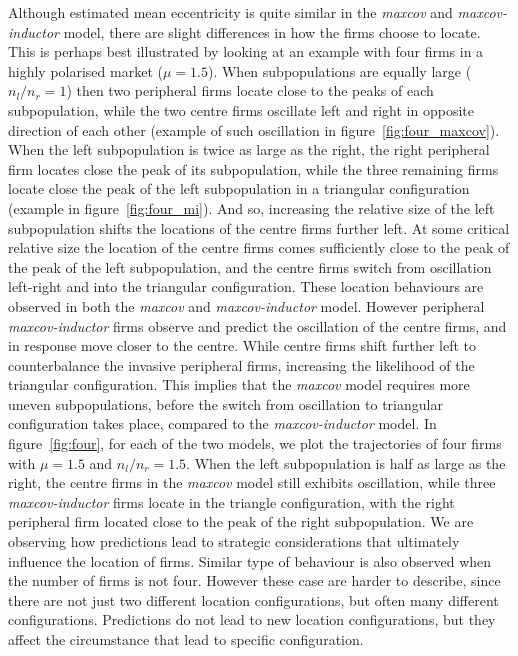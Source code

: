 \documentclass[preprint, 12pt]{elsarticle}
\begin{document}
Although estimated mean eccentricity is quite similar in the \emph{maxcov} and \emph{maxcov-inductor} model, there are slight differences in how the firms choose to locate. This is perhaps best illustrated by looking at an example with four firms in a highly polarised market ($\mu=1.5$). When subpopulations are equally large ($n_l/n_r = 1$) then two peripheral firms locate close to the peaks of each subpopulation, while the two centre firms oscillate left and right in opposite direction of each other (example of such oscillation in figure~\ref{fig:four_maxcov}). When the left subpopulation is twice as large as the right, the right peripheral firm locates close the peak of its subpopulation, while the three remaining firms locate close the peak of the left subpopulation in a triangular configuration (example in figure~\ref{fig:four_mi}). And so, increasing the relative size of the left subpopulation shifts the locations of the centre firms further left. At some critical relative size the location of the centre firms comes sufficiently close to the peak of the peak of the left subpopulation, and the centre firms switch from oscillation left-right and into the triangular configuration. These location behaviours are observed in both the \emph{maxcov} and \emph{maxcov-inductor} model. However peripheral \emph{maxcov-inductor} firms observe and predict the oscillation of the centre firms, and in response move closer to the centre. While centre firms shift further left to counterbalance the invasive peripheral firms, increasing the likelihood of the triangular configuration. This implies that the \emph{maxcov} model requires more uneven subpopulations, before the switch from oscillation to triangular configuration takes place, compared to the \emph{maxcov-inductor} model. In figure~\ref{fig:four}, for each of the two models, we plot the trajectories of four firms with $\mu=1.5$ and $n_l/n_r = 1.5$. When the left subpopulation is half as large as the right, the centre firms in the \emph{maxcov} model still exhibits oscillation, while three \emph{maxcov-inductor} firms locate in the triangle configuration, with the right peripheral firm located close to the peak of the right subpopulation. We are observing how predictions lead to strategic considerations that ultimately influence the location of firms. Similar type of behaviour is also observed when the number of firms is not four. However these case are harder to describe, since there are not just two different location configurations, but often many different configurations. Predictions do not lead to new location configurations, but they affect the circumstance that lead to specific configuration.
\end{document}
